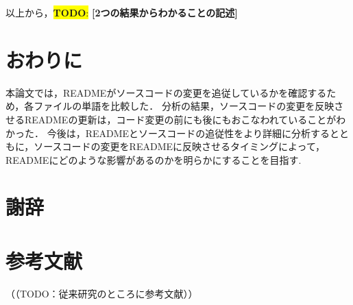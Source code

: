 \documentclass[uplatex,dvipdfmx,a4paper,twocolumn,base=11pt,jbase=11pt,ja=standard]{bxjsarticle}  %
\newcommand{\todo}[1]{\colorbox{yellow}{{\bf TODO}:}{\color{red} {\textbf{[#1]}}}}
\begin{document}
以上から，\todo{2つの結果からわかることの記述}






\section{おわりに}




本論文では，READMEがソースコードの変更を追従しているかを確認するため，各ファイルの単語を比較した．
分析の結果，ソースコードの変更を反映させるREADMEの更新は，コード変更の前にも後にもおこなわれていることがわかった．
今後は，READMEとソースコードの追従性をより詳細に分析するとともに，ソースコードの変更をREADMEに反映させるタイミングによって，READMEにどのような影響があるのかを明らかにすることを目指す.



\section*{謝辞}


\section*{参考文献}



（（TODO：従来研究のところに参考文献））










\end{document}
